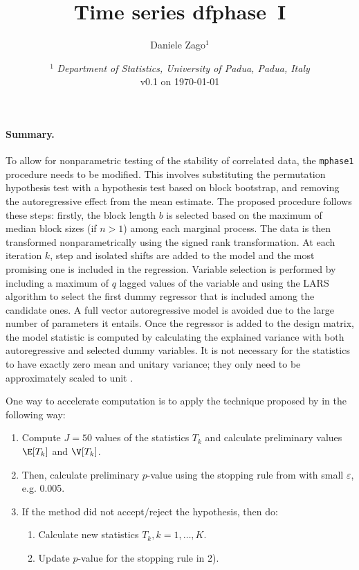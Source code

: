 \documentclass{article}
\author{Daniele Zago$^1$}
\title{Time series dfphase~I}
\date{%
\smaller
$^1$ \textit{Department of Statistics, University of Padua, Padua, Italy}\\%
v0.1 on \today}
\begin{document}
\maketitle

\paragraph{Summary.}
To allow for nonparametric testing of the stability of correlated data, the \texttt{mphase1} procedure needs to be modified.
 This involves substituting the permutation hypothesis test with a hypothesis test based on block bootstrap, and removing the autoregressive effect from the mean estimate.
 The proposed procedure follows these steps: firstly, the block length $b$ is selected based on the maximum of median block sizes (if $ n > 1$) among each marginal process.
 The data is then transformed nonparametrically using the signed rank transformation.
 At each iteration $k$, step and isolated shifts are added to the model and the most promising one is included in the regression.
 Variable selection is performed by including a maximum of $q$ lagged values of the variable and using the LARS algorithm to select the first dummy regressor that is included among the candidate ones.
 A full vector autoregressive model is avoided due to the large number of parameters it entails.
 Once the regressor is added to the design matrix, the model statistic is computed by calculating the explained variance with both autoregressive and selected dummy variables.
 It is not necessary for the statistics to have exactly zero mean and unitary variance; they only need to be approximately scaled to unit \citep{pesarin2016}.

One way to accelerate computation is to apply the technique proposed by \citet{ding2020} in the following way:
\begin{enumerate}[label=\arabic*)]
    \item Compute $ J = 50$ values of the statistics $ T_{k}$ and calculate preliminary values $ \E[T_{k}]$ and $ \V[T_{k}]$. 
    \item Then, calculate preliminary $ p$-value using the stopping rule from \citet{ding2020} with small $ \varepsilon$, e.g. 0.005.
    \item If the method did not accept/reject the hypothesis, then do:
        \begin{enumerate}
            \item Calculate new statistics $ T_{k}, k = 1, \ldots, K$.
            \item Update $ p$-value for the stopping rule in 2).
        \end{enumerate}
\end{enumerate}


\printbibliography
\end{document}

